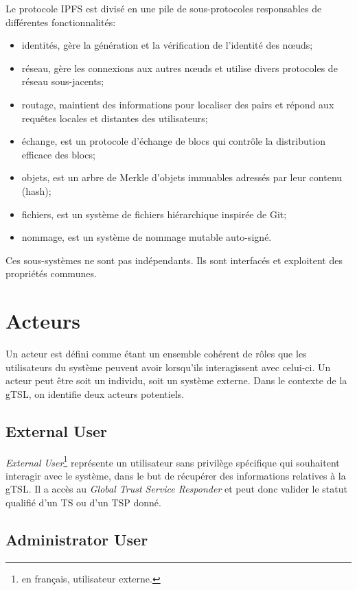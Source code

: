 \documentclass{tnreport}
\begin{document}
Le protocole IPFS est divisé en une pile de sous-protocoles responsables de différentes fonctionnalités:
\begin{itemize}
	\item identités, gère la génération et la vérification de l'identité des nœuds;
	\item réseau, gère les connexions aux autres nœuds et utilise divers protocoles de réseau sous-jacents;
	\item routage, maintient des informations pour localiser des pairs et répond aux requêtes locales et distantes des utilisateurs;
	\item échange, est un protocole d'échange de blocs qui contrôle la distribution efficace des blocs;
	\item objets, est un arbre de Merkle d'objets immuables adressés par leur contenu (hash);
	\item fichiers, est un système de fichiers hiérarchique inspirée de Git;
	\item nommage, est un système de nommage mutable auto-signé.
	\newline
\end{itemize}
Ces sous-systèmes ne sont pas indépendants. Ils sont interfacés et exploitent des propriétés communes.

\section{Acteurs}

Un acteur est défini comme étant un ensemble cohérent de rôles que les utilisateurs du système peuvent avoir lorsqu'ils interagissent avec celui-ci. Un acteur peut être soit un individu, soit un système externe. Dans le contexte de la gTSL, on identifie deux acteurs potentiels.

\subsection{External User}

\textit{External User}\footnote{en français, utilisateur externe.} représente un utilisateur sans privilège spécifique qui souhaitent interagir avec le système, dans le but de récupérer des informations relatives à la gTSL. Il a accès au \textit{Global Trust Service Responder} et peut donc valider le statut qualifié d'un TS ou d'un TSP donné.

\subsection{Administrator User}
\end{document}
